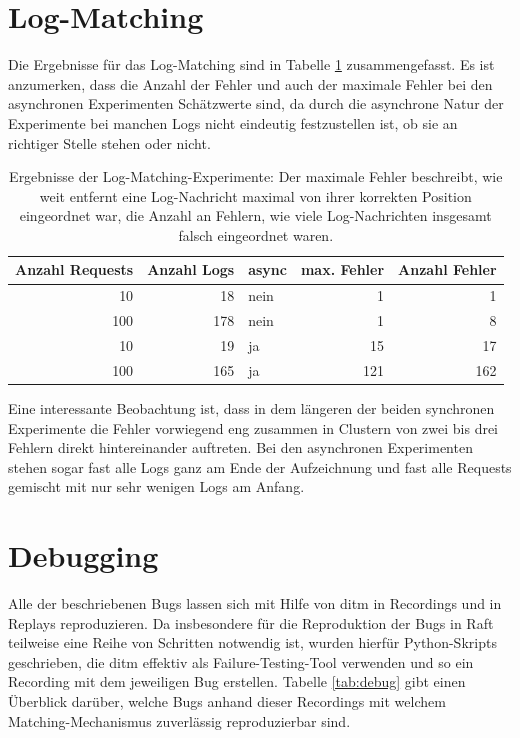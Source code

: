 \documentclass[12pt,a4paper]{report}
\begin{document}
\section{Log-Matching}
Die Ergebnisse für das Log-Matching sind in Tabelle \ref{tab:logs} zusammengefasst.
Es ist anzumerken, dass die Anzahl der Fehler und auch der maximale Fehler bei den asynchronen Experimenten Schätzwerte sind, da durch
die asynchrone Natur der Experimente bei manchen Logs nicht eindeutig festzustellen ist, ob sie an richtiger Stelle stehen oder nicht.
\begin{table}[H]
	\centering
	\caption[Ergebnisse der Log-Matching-Experimente]{
		Ergebnisse der Log-Matching-Experimente: Der maximale Fehler beschreibt, wie weit entfernt eine Log-Nachricht maximal von
		ihrer korrekten Position eingeordnet war, die Anzahl an Fehlern, wie viele Log-Nachrichten insgesamt falsch eingeordnet waren.
	}
	\label{tab:logs}
	\begin{tabular}{|r|r|l|r|r|}
		\hline
		Anzahl Requests & Anzahl Logs & async & max. Fehler & Anzahl Fehler \\ \hline
		10              & 18          & nein  & 1           & 1             \\ \hline
		100             & 178         & nein  & 1           & 8             \\ \hline
		10              & 19          & ja    & 15          & 17            \\ \hline
		100             & 165         & ja    & 121         & 162           \\ \hline
	\end{tabular}
\end{table}

Eine interessante Beobachtung ist, dass in dem längeren der beiden synchronen Experimente die Fehler vorwiegend eng zusammen in Clustern
von zwei bis drei Fehlern direkt hintereinander auftreten. Bei den asynchronen Experimenten stehen sogar fast alle Logs ganz am Ende der Aufzeichnung
und fast alle Requests gemischt mit nur sehr wenigen Logs am Anfang.

\section{Debugging}
Alle der beschriebenen Bugs lassen sich mit Hilfe von ditm in Recordings und in Replays reproduzieren. Da insbesondere für die
Reproduktion der Bugs in Raft teilweise eine Reihe von Schritten notwendig ist, wurden hierfür Python-Skripts geschrieben, die
ditm effektiv als Failure-Testing-Tool verwenden und so ein Recording mit dem jeweiligen Bug erstellen. Tabelle \ref{tab:debug}
gibt einen Überblick darüber, welche Bugs anhand dieser Recordings mit welchem Matching-Mechanismus zuverlässig reproduzierbar
sind.
\end{document}
